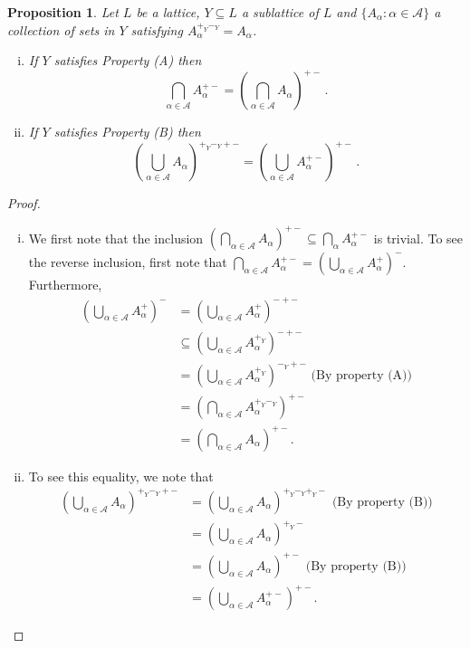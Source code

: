 \documentclass[12pt,a4paper]{amsart}
\numberwithin{equation}{section}
\newtheorem{prop}[thm]{Proposition}
\theoremstyle{definition}
\begin{document}
\begin{prop}\label{27}
	Let $L$ be a lattice, $Y \subseteq L$ a sublattice of $L$ and $\{A_{\alpha} : \alpha \in \mathcal{A} \}$ a collection of sets in $Y$ satisfying $A_{\alpha}^{+_{Y}-_{Y}} = A_{\alpha}$.
	\begin{enumerate}[(i)]
		\item If $Y$ satisfies Property (A) then 
\[\bigcap_{\alpha \in \mathcal{A}} A_{\alpha}^{+-} = \left(\bigcap_{\alpha \in \mathcal{A}} A_{\alpha}\right)^{+-}\,.\]
		\item If $Y$ satisfies Property (B)  then 
\[\left(\bigcup_{\alpha \in \mathcal{A}} A_{\alpha}\right)^{+_{Y}-_{Y}+-} = \left(\bigcup_{\alpha \in \mathcal{A}} A_{\alpha}^{+-}\right)^{+-}\,.\]
	\end{enumerate}
\end{prop}
\begin{proof}
	\begin{enumerate}[(i)] 
		\item We first note that the inclusion $(\bigcap_{\alpha \in \mathcal{A}} A_{\alpha})^{+-} \subseteq \bigcap_{\alpha} A_{\alpha}^{+-}$ is trivial. To see the reverse inclusion, first note that $\bigcap_{\alpha \in \mathcal{A}} A_{\alpha}^{+-}  = (\bigcup_{\alpha \in \mathcal{A}} A_{\alpha}^{+})^{-}$. Furthermore,
		 \begin{align*}
			 \left(\bigcup_{\alpha \in \mathcal{A}} A_{\alpha}^{+}\right)^{-} &= \left(\bigcup_{\alpha \in \mathcal{A}} A_{\alpha}^{+}\right)^{-+-}\\
			&\subseteq \left(\bigcup_{\alpha \in \mathcal{A}} A_{\alpha}^{+_{Y}}\right)^{-+-} \\
			&=\left (\bigcup_{\alpha \in \mathcal{A}} A_{\alpha}^{+_{Y}}\right)^{-_{Y}+-} \text{ (By property (A))}\\
			&=\left (\bigcap_{\alpha \in \mathcal{A}} A_{\alpha}^{+_{Y}-_{Y}}\right)^{+-} \\
			&= \left(\bigcap_{\alpha \in \mathcal{A}} A_{\alpha}\right )^{+-}.
		\end{align*}
	\item To see this equality, we note that
	\begin{align*}
		\left(\bigcup_{\alpha \in \mathcal{A}} A_{\alpha}\right)^{+_{Y}-_{Y}+-} &= \left(\bigcup_{\alpha \in \mathcal{A}} A_{\alpha}\right)^{+_{Y}-_{Y} +_{Y}-} \text{ (By property (B))}\\
		&=\left (\bigcup_{\alpha \in \mathcal{A}} A_{\alpha}\right)^{+_{Y}-}\\
		&=\left (\bigcup_{\alpha \in \mathcal{A}} A_{\alpha}\right)^{+-} \text{ (By property (B))}\\
		&= \left(\bigcup_{\alpha \in \mathcal{A}} A_{\alpha}^{+-}\right)^{+-}.
	\end{align*}
	\end{enumerate}
\end{proof}	
\end{document}
